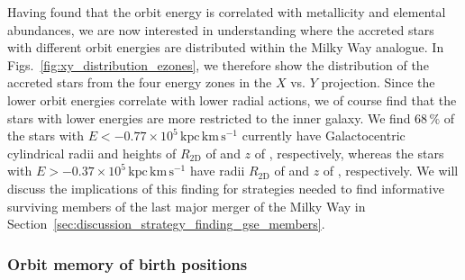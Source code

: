 \documentclass[fleqn,usenatbib]{mnras}
\begin{document}
Having found that the orbit energy is correlated with metallicity and elemental abundances, we are now interested in understanding where the accreted stars with different orbit energies are distributed within the Milky Way analogue. In Figs.~\ref{fig:xy_distribution_ezones}, we therefore show the distribution of the accreted stars from the four energy zones in the $X$ vs. $Y$ projection. Since the lower orbit energies correlate with lower radial actions, we of course find that the stars with lower energies are more restricted to the inner galaxy. We find $68\,\mathrm{\%}$ of the stars with $E < -0.77\times10^5\,\mathrm{kpc\,km\,s^{-1}}$ currently have Galactocentric cylindrical radii and heights of $R_\mathrm{2D}$ of  and $z$ of , respectively, whereas the stars with $E > -0.37\times10^5\,\mathrm{kpc\,km\,s^{-1}}$ have radii $R_\mathrm{2D}$ of  and $z$ of , respectively. We will discuss the implications of this finding for strategies needed to find informative surviving members of the last major merger of the Milky Way in Section~\ref{sec:discussion_strategy_finding_gse_members}.

\subsubsection{Orbit memory of birth positions}
\end{document}
